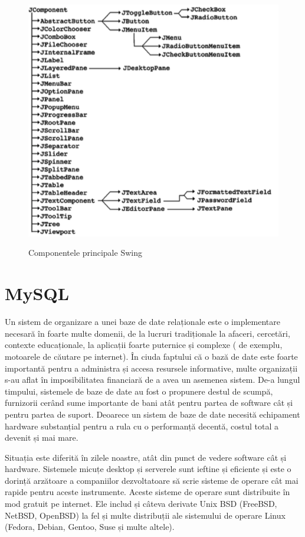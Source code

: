 \documentclass[12pt]{book}
\begin{document}
\begin{figure}[!ht]
	\centering
	\includegraphics{Swing}
	\caption{Componentele principale Swing}
	\cite{swingBook}
\end{figure}

\section{MySQL}
Un sistem de organizare a unei baze de date relaționale este o implementare necesară în foarte multe domenii, de la lucruri tradiționale la afaceri, cercetări, contexte educaționale, la aplicații foarte puternice și complexe ( de exemplu, motoarele de căutare pe internet). În ciuda faptului că o bază de date este foarte importantă pentru a administra și accesa resursele informative, multe organizații s-au aflat în imposibilitatea financiară de a avea un asemenea sistem. De-a lungul timpului, sistemele de baze de date au fost o propunere destul de scumpă, furnizorii cerând sume importante de bani atât pentru partea de software cât și pentru partea de suport. Deoarece un sistem de baze de date necesită echipament hardware substanțial pentru a rula cu o performanță decentă, costul total a devenit și mai mare. 

Situația este diferită în zilele noastre, atât din punct de vedere software cât și hardware. Sistemele micuțe desktop și serverele sunt ieftine și eficiente și este o dorință arzătoare a companiilor dezvoltatoare să scrie sisteme de operare cât mai rapide pentru aceste instrumente. Aceste sisteme de operare sunt distribuite în mod gratuit pe internet. Ele includ și câteva derivate Unix BSD (FreeBSD, NetBSD, OpenBSD) la fel și multe distribuții ale sistemului de operare Linux (Fedora, Debian, Gentoo, Suse și multe altele). \cite{mySqlDeveloperLibrary}
\end{document}
